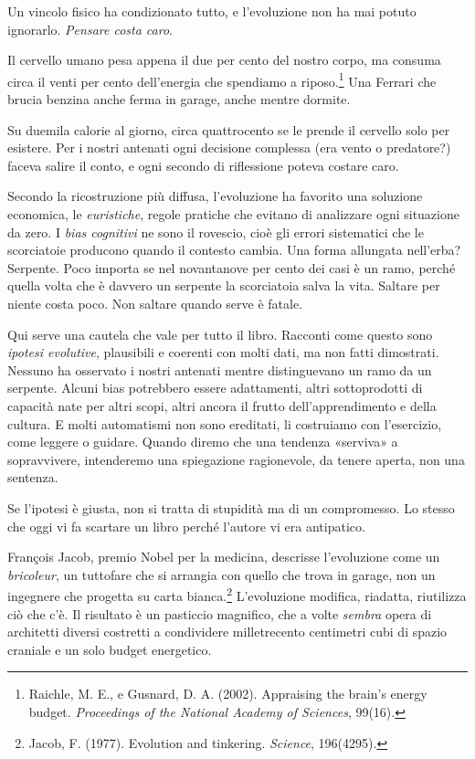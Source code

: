 Un vincolo fisico ha condizionato tutto, e l'evoluzione non ha mai potuto ignorarlo. \textit{Pensare costa caro}.

Il cervello umano pesa appena il due per cento del nostro corpo, ma consuma circa il venti per cento dell'energia che spendiamo a riposo.\footnote{Raichle, M. E., e Gusnard, D. A. (2002). Appraising the brain's energy budget. \textit{Proceedings of the National Academy of Sciences}, 99(16).} Una Ferrari che brucia benzina anche ferma in garage, anche mentre dormite.

Su duemila calorie al giorno, circa quattrocento se le prende il cervello solo per esistere. Per i nostri antenati ogni decisione complessa (era vento o predatore?) faceva salire il conto, e ogni secondo di riflessione poteva costare caro.

Secondo la ricostruzione più diffusa, l'evoluzione ha favorito una soluzione economica, le \textit{euristiche}, regole pratiche che evitano di analizzare ogni situazione da zero. I \textit{bias cognitivi} ne sono il rovescio, cioè gli errori sistematici che le scorciatoie producono quando il contesto cambia. Una forma allungata nell'erba? Serpente. Poco importa se nel novantanove per cento dei casi è un ramo, perché quella volta che è davvero un serpente la scorciatoia salva la vita. Saltare per niente costa poco. Non saltare quando serve è fatale.

Qui serve una cautela che vale per tutto il libro. Racconti come questo sono \textit{ipotesi evolutive}, plausibili e coerenti con molti dati, ma non fatti dimostrati. Nessuno ha osservato i nostri antenati mentre distinguevano un ramo da un serpente. Alcuni bias potrebbero essere adattamenti, altri sottoprodotti di capacità nate per altri scopi, altri ancora il frutto dell'apprendimento e della cultura. E molti automatismi non sono ereditati, li costruiamo con l'esercizio, come leggere o guidare. Quando diremo che una tendenza «serviva» a sopravvivere, intenderemo una spiegazione ragionevole, da tenere aperta, non una sentenza.

Se l'ipotesi è giusta, non si tratta di stupidità ma di un compromesso. Lo stesso che oggi vi fa scartare un libro perché l'autore vi era antipatico.

Fran\c{c}ois Jacob, premio Nobel per la medicina, descrisse l'evoluzione come un \textit{bricoleur}, un tuttofare che si arrangia con quello che trova in garage, non un ingegnere che progetta su carta bianca.\footnote{Jacob, F. (1977). Evolution and tinkering. \textit{Science}, 196(4295).} L'evoluzione modifica, riadatta, riutilizza ciò che c'è. Il risultato è un pasticcio magnifico, che a volte \textit{sembra} opera di architetti diversi costretti a condividere milletrecento centimetri cubi di spazio craniale e un solo budget energetico.

